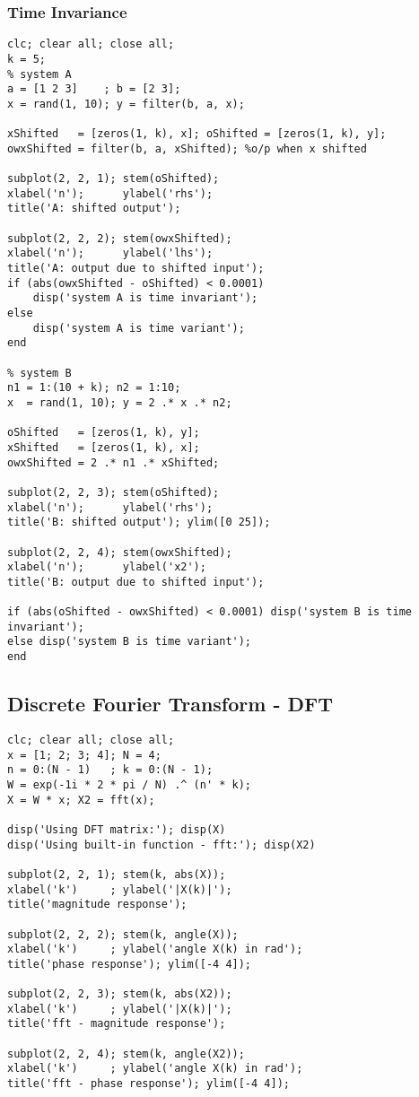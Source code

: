 \documentclass[12pt]{article}
\newcommand{\sectionc}[1]{\pagebreak {\centering \section{#1}} \vspace*{1cm}}
\begin{document}
\subsubsection{Time Invariance}
\begin{verbatim}
clc; clear all; close all;
k = 5;
% system A
a = [1 2 3]    ; b = [2 3];
x = rand(1, 10); y = filter(b, a, x);

xShifted   = [zeros(1, k), x]; oShifted = [zeros(1, k), y];
owxShifted = filter(b, a, xShifted); %o/p when x shifted

subplot(2, 2, 1); stem(oShifted);
xlabel('n');      ylabel('rhs');
title('A: shifted output');

subplot(2, 2, 2); stem(owxShifted);
xlabel('n');      ylabel('lhs');
title('A: output due to shifted input');
if (abs(owxShifted - oShifted) < 0.0001)
    disp('system A is time invariant');
else
    disp('system A is time variant');
end

% system B
n1 = 1:(10 + k); n2 = 1:10;
x  = rand(1, 10); y = 2 .* x .* n2;

oShifted   = [zeros(1, k), y];
xShifted   = [zeros(1, k), x];
owxShifted = 2 .* n1 .* xShifted;

subplot(2, 2, 3); stem(oShifted);
xlabel('n');      ylabel('rhs');
title('B: shifted output'); ylim([0 25]);

subplot(2, 2, 4); stem(owxShifted);
xlabel('n');      ylabel('x2');
title('B: output due to shifted input');

if (abs(oShifted - owxShifted) < 0.0001) disp('system B is time invariant');
else disp('system B is time variant');
end
\end{verbatim}

\sectionc{Fourier Transforms}
\subsection{Discrete Fourier Transform - DFT}
\begin{verbatim}
clc; clear all; close all;
x = [1; 2; 3; 4]; N = 4;
n = 0:(N - 1)   ; k = 0:(N - 1);
W = exp(-1i * 2 * pi / N) .^ (n' * k);
X = W * x; X2 = fft(x);

disp('Using DFT matrix:'); disp(X)
disp('Using built-in function - fft:'); disp(X2)

subplot(2, 2, 1); stem(k, abs(X));
xlabel('k')     ; ylabel('|X(k)|');
title('magnitude response');

subplot(2, 2, 2); stem(k, angle(X));
xlabel('k')     ; ylabel('angle X(k) in rad');
title('phase response'); ylim([-4 4]);

subplot(2, 2, 3); stem(k, abs(X2));
xlabel('k')     ; ylabel('|X(k)|');
title('fft - magnitude response');

subplot(2, 2, 4); stem(k, angle(X2));
xlabel('k')     ; ylabel('angle X(k) in rad');
title('fft - phase response'); ylim([-4 4]);
\end{verbatim}
\end{document}
